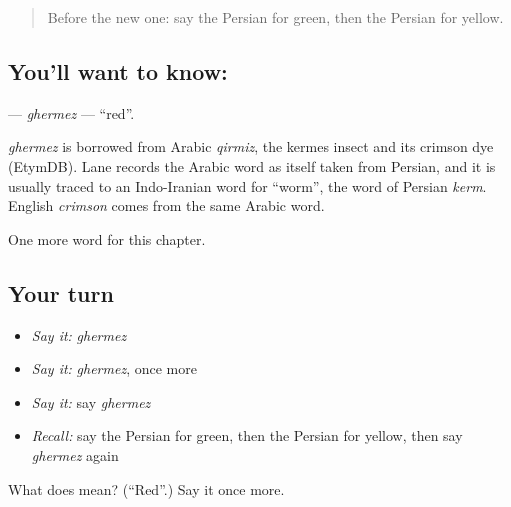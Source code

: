 \begin{quote}
Before the new one: say the Persian for green, then the Persian for yellow.
\end{quote}

\subsection*{You'll want to know: }
\textbf{} — \emph{ghermez} — \textquotedblleft{}red\textquotedblright{}.

\begin{cousinweb}
\emph{ghermez} is borrowed from Arabic \emph{qirmiz}, the kermes insect and its crimson dye (EtymDB). Lane records the Arabic word as itself taken from Persian, and it is usually traced to an Indo-Iranian word for \textquotedblleft{}worm\textquotedblright{}, the word of Persian \emph{kerm}. English \emph{crimson} comes from the same Arabic word.
\end{cousinweb}

\begin{grammarlens}[title={What you've built}]
One more word for this chapter.
\end{grammarlens}

\subsection*{Your turn}
\begin{itemize}
\raggedright
  \item \emph{Say it:} \emph{ghermez}
  \item \emph{Say it:} \emph{ghermez}, once more
  \item \emph{Say it:} say \emph{ghermez}
  \item \emph{Recall:} say the Persian for green, then the Persian for yellow, then say \emph{ghermez} again
\end{itemize}

\begin{tcolorbox}[breakable,colback=teal!4,colframe=teal!35!black,title={Before you move on}]
What does  mean? (\textquotedblleft{}Red\textquotedblright{}.) Say it once more.
\end{tcolorbox}
